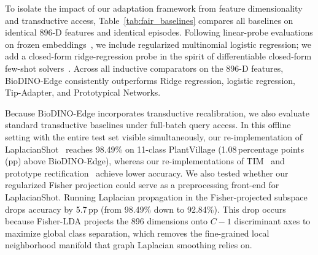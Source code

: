 To isolate the impact of our adaptation framework from feature dimensionality and transductive access, Table~\ref{tab:fair_baselines} compares all baselines on identical 896-D features and identical episodes. Following linear-probe evaluations on frozen embeddings~\cite{tian2020rethinking}, we include regularized multinomial logistic regression; we add a closed-form ridge-regression probe in the spirit of differentiable closed-form few-shot solvers~\cite{bertinetto2019r2d2}. Across all inductive comparators on the 896-D features, BioDINO-Edge consistently outperforms Ridge regression, logistic regression, Tip-Adapter, and Prototypical Networks.

Because BioDINO-Edge incorporates transductive recalibration, we also evaluate standard transductive baselines under full-batch query access. In this offline setting with the entire test set visible simultaneously, our re-implementation of LaplacianShot~\cite{ziko2020laplacian} reaches 98.49\% on 11-class PlantVillage (1.08\,percentage points (pp) above BioDINO-Edge), whereas our re-implementations of TIM~\cite{boudiaf2020transductive} and prototype rectification~\cite{liu2020bdcspn} achieve lower accuracy. We also tested whether our regularized Fisher projection could serve as a preprocessing front-end for LaplacianShot. Running Laplacian propagation in the Fisher-projected subspace drops accuracy by 5.7\,pp (from 98.49\% down to 92.84\%). This drop occurs because Fisher-LDA projects the 896 dimensions onto $C-1$ discriminant axes to maximize global class separation, which removes the fine-grained local neighborhood manifold that graph Laplacian smoothing relies on.

